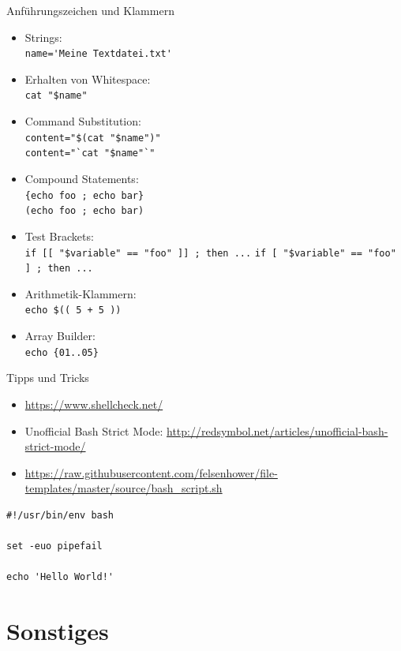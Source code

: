 \documentclass[compress]{beamer}
\begin{document}
\begin{frame}[fragile]{Anführungszeichen und Klammern}
\vspace*{-2.5mm}
\footnotesize
\begin{itemize}
\item Strings:\\
\verb+name='Meine Textdatei.txt'+
\item Erhalten von Whitespace:\\
\verb+cat "$name"+
\item Command Substitution:\\
\verb+content="$(cat "$name")"+\\
\verb+content="`cat "$name"`"+
\item Compound Statements:\\
\verb+{echo foo ; echo bar}+\\
\verb+(echo foo ; echo bar)+
\item Test Brackets:\\
\verb+if [[ "$variable" == "foo" ]] ; then ...+
\verb+if [ "$variable" == "foo" ] ; then ...+
\item Arithmetik-Klammern:\\
\verb|echo $(( 5 + 5 ))|
\item Array Builder:\\
\verb+echo {01..05}+
\end{itemize}
\end{frame}

\begin{frame}[fragile]{Tipps und Tricks}
\begin{itemize}
\item \url{https://www.shellcheck.net/}
\item Unofficial Bash Strict Mode: \url{http://redsymbol.net/articles/unofficial-bash-strict-mode/}
\item \url{https://raw.githubusercontent.com/felsenhower/file-templates/master/source/bash_script.sh}
\end{itemize}

\vspace*{5mm}

\begin{verbatim}
#!/usr/bin/env bash

set -euo pipefail

echo 'Hello World!'
\end{verbatim}
\end{frame}

\section{Sonstiges}
\end{document}
